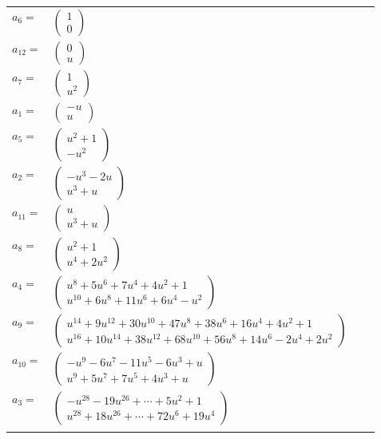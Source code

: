 \documentclass[1p]{elsarticle_modified}
\theoremstyle{definition}
\begin{document}
\begin{tabular}{m{7pt} m{180pt} m{7pt} m{180pt} }
\flushright $a_{6}=$&$\begin{pmatrix}1\\0\end{pmatrix}$ \\
\flushright $a_{12}=$&$\begin{pmatrix}0\\u\end{pmatrix}$ \\
\flushright $a_{7}=$&$\begin{pmatrix}1\\u^2\end{pmatrix}$ \\
\flushright $a_{1}=$&$\begin{pmatrix}- u\\u\end{pmatrix}$ \\
\flushright $a_{5}=$&$\begin{pmatrix}u^2+1\\- u^2\end{pmatrix}$ \\
\flushright $a_{2}=$&$\begin{pmatrix}- u^3-2 u\\u^3+u\end{pmatrix}$ \\
\flushright $a_{11}=$&$\begin{pmatrix}u\\u^3+u\end{pmatrix}$ \\
\flushright $a_{8}=$&$\begin{pmatrix}u^2+1\\u^4+2 u^2\end{pmatrix}$ \\
\flushright $a_{4}=$&$\begin{pmatrix}u^8+5 u^6+7 u^4+4 u^2+1\\u^{10}+6 u^8+11 u^6+6 u^4- u^2\end{pmatrix}$ \\
\flushright $a_{9}=$&$\begin{pmatrix}u^{14}+9 u^{12}+30 u^{10}+47 u^8+38 u^6+16 u^4+4 u^2+1\\u^{16}+10 u^{14}+38 u^{12}+68 u^{10}+56 u^8+14 u^6-2 u^4+2 u^2\end{pmatrix}$ \\
\flushright $a_{10}=$&$\begin{pmatrix}- u^9-6 u^7-11 u^5-6 u^3+u\\u^9+5 u^7+7 u^5+4 u^3+u\end{pmatrix}$ \\
\flushright $a_{3}=$&$\begin{pmatrix}- u^{28}-19 u^{26}+\cdots+5 u^2+1\\u^{28}+18 u^{26}+\cdots+72 u^6+19 u^4\end{pmatrix}$\\&\end{tabular}
\end{document}
